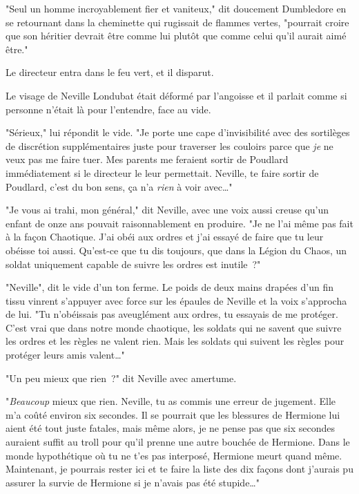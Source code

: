 "Seul un homme incroyablement fier et vaniteux," dit doucement Dumbledore en se retournant dans la cheminette qui rugissait de flammes vertes, "pourrait croire que son héritier devrait être comme lui plutôt que comme celui qu'il aurait aimé être."

Le directeur entra dans le feu vert, et il disparut.


Le visage de Neville Londubat était déformé par l'angoisse et il parlait comme si personne n'était là pour l'entendre, face au vide.

"Sérieux," lui répondit le vide. "Je porte une cape d'invisibilité avec des sortilèges de discrétion supplémentaires juste pour traverser les couloirs parce que \emph{je} ne veux pas me faire tuer. Mes parents me feraient sortir de Poudlard immédiatement si le directeur le leur permettait. Neville, te faire sortir de Poudlard, c'est du bon sens, ça n'a \emph{rien} à voir avec…"

"Je vous ai trahi, mon général," dit Neville, avec une voix aussi creuse qu'un enfant de onze ans pouvait raisonnablement en produire. "Je ne l'ai même pas fait à la façon Chaotique. J'ai obéi aux ordres et j'ai essayé de faire que tu leur obéisse toi aussi. Qu'est-ce que tu dis toujours, que dans la Légion du Chaos, un soldat uniquement capable de suivre les ordres est inutile~?"

"Neville", dit le vide d'un ton ferme. Le poids de deux mains drapées d'un fin tissu vinrent s'appuyer avec force sur les épaules de Neville et la voix s'approcha de lui. "Tu n'obéissais pas aveuglément aux ordres, tu essayais de me protéger. C'est vrai que dans notre monde chaotique, les soldats qui ne savent que suivre les ordres et les règles ne valent rien. Mais les soldats qui suivent les règles pour protéger leurs amis valent…"

"Un peu mieux que rien~?" dit Neville avec amertume.

"\emph{Beaucoup} mieux que rien. Neville, tu as commis une erreur de jugement. Elle m'a coûté environ six secondes. Il se pourrait que les blessures de Hermione lui aient été tout juste fatales, mais même alors, je ne pense pas que six secondes auraient suffit au troll pour qu'il prenne une autre bouchée de Hermione. Dans le monde hypothétique où tu ne t'es pas interposé, Hermione meurt quand même. Maintenant, je pourrais rester ici et te faire la liste des dix façons dont j'aurais pu assurer la survie de Hermione si je n'avais pas été stupide…"

